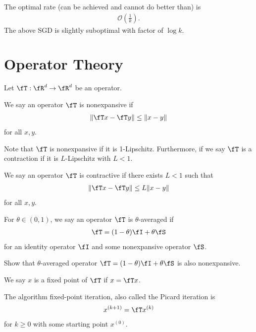 \documentclass{article}
\begin{document}
\begin{remark}
    The optimal rate (can be achieved and cannot do better than) is
\begin{align}
    \mathcal{O}\left(\frac{1}{k}\right).
\end{align}
The above SGD is slightly suboptimal with factor of $\log k$.
\end{remark}

\section{Operator Theory}
Let $\fT:\fR^d\rightarrow \fR^d$ be an operator.
\begin{definition}
    We say an operator $\fT$ is nonexpansive if
    \begin{align}
        \|\fT x - \fT y \| \leq \|x-y\|
    \end{align}
    for all $x, y$.
\end{definition}
Note that $\fT$ is nonexpansive if it is 1-Lipschitz.
Furthermore, if we say $\fT$ is a contraction if it is $L$-Lipschitz with $L< 1$.
\begin{definition}
    We say an operator $\fT$ is contractive if
    there exists $L<1$ such that 
    \begin{align}
        \|\fT x - \fT y \| \leq L \|x-y\|
    \end{align}
    for all $x, y$.
\end{definition}


\begin{definition}
For $\theta\in(0, 1)$, we say an operator $\fT$ is $\theta$-averaged if
    \begin{align}
        \fT = (1-\theta)\fI + \theta \fS
    \end{align}
    for an identity operator $\fI$ and some nonexpansive operator $\fS$.
\end{definition}

\begin{exercise}
    Show that $\theta$-averaged operator $\fT = (1-\theta)\fI + \theta\fS$ is also nonexpansive. 
\end{exercise}

\begin{definition}
    We say $x$ is a fixed point of $\fT$ if $x = \fT x$.
\end{definition}
The algorithm fixed-point iteration, also called the Picard iteration is
\begin{align}
    x^{(k+1)} = \fT x^{(k)}
\end{align}
for $k\geq 0$ with some starting point $x^{(0)}$.
\end{document}
